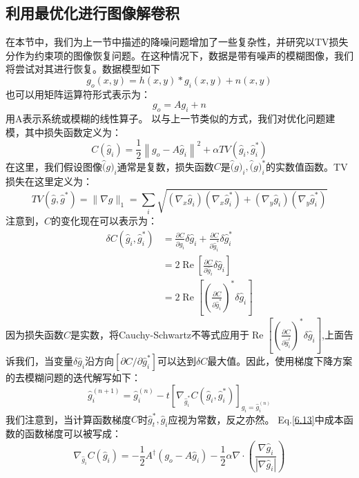 \documentclass[12pt, UTF8]{ctexart}%
\numberwithin{equation}{section}
\numberwithin{figure}{section}
\newcommand{\InsertEqution}[2]{\begin{equation}
  \label{#1}
   #2
 \end{equation}}
\newcommand{\RefEq}[1]{Eq.\ref{#1}}
\newcommand{\InsertInlineEq}[1]{$#1$}
\begin{document}
\begin{sloppypar}
\subsection{利用最优化进行图像解卷积}
在本节中，我们为上一节中描述的降噪问题增加了一些复杂性，并研究以TV损失分作为约束项的图像恢复问题。在这种情况下，数据是带有噪声的模糊图像，我们将尝试对其进行恢复。数据模型如下
\InsertEqution{6.11}{g_{o}(x, y)=h(x, y) * g_{i}(x, y)+n(x, y)}
也可以用矩阵运算符形式表示为：
\InsertEqution{6.12}{g_{o}=A g_{i}+n}
用A表示系统或模糊的线性算子。 以与上一节类似的方式，我们对优化问题建模，其中损失函数定义为：
\InsertEqution{6.13}{C\left(\hat{g}_{i}\right)=\frac{1}{2}\left\|g_{o}-A \hat{g}_{i}\right\|^{2}+\alpha T V\left(\hat{g}_{i}, \hat{g}_{i}^{*}\right)}
在这里，我们假设图像\InsertInlineEq{\hat(g)_i}通常是复数，损失函数\InsertInlineEq{C}是\InsertInlineEq{\hat(g)_i,\hat(g)_i^*}的实数值函数。TV损失在这里定义为：
\InsertEqution{6.14}{T V\left(\hat{g}, \hat{g}^{*}\right)=\|\nabla g\|_{1}=\sum_{i} \sqrt{\left(\nabla_{x} \hat{g}_{i}\right)\left(\nabla_{x} \hat{g}_{i}^{*}\right)+\left(\nabla_{y} \hat{g}_{i}\right)\left(\nabla_{y} \hat{g}_{i}^{*}\right)}}
注意到，\InsertInlineEq{C}的变化现在可以表示为：
\InsertEqution{6.15}{\begin{aligned}
  \delta C\left(\hat{g}_{i}, \hat{g}_{i}^{*}\right) &=\frac{\partial C}{\partial \hat{g}_{i}} \delta \hat{g}_{i}+\frac{\partial C}{\partial \hat{g}_{i}^{*}} \delta \hat{g}_{i}^{*} \\
  &=2 \operatorname{Re}\left[\frac{\partial C}{\partial \hat{g}_{i}} \delta \hat{g}_{i}\right] \\
  &=2 \operatorname{Re}\left[\left(\frac{\partial C}{\partial \hat{g}_{i}^{*}}\right)^{*} \delta \hat{g}_{i}\right]
  \end{aligned}}
因为损失函数\InsertInlineEq{C}是实数，将Cauchy-Schwartz不等式应用于\InsertInlineEq{\operatorname{Re}\left[\left(\frac{\partial C}{\partial \hat{g}_{i}^{i}}\right)^{*} \delta \hat{g}_{i}\right]},上面告诉我们，当变量\InsertInlineEq{\delta \hat{g}_i}沿方向\InsertInlineEq{\left[\partial C / \partial \hat{g}_{i}^{*}\right]}可以达到\InsertInlineEq{\delta C}最大值。因此，使用梯度下降方案的去模糊问题的迭代解写如下：
\InsertEqution{6.16}{\hat{g}_{i}^{(n+1)}=\hat{g}_{i}^{(n)}-t\left[\nabla_{\hat{g}_{i}^{*}} C\left(\hat{g}_{i}, \hat{g}_{i}^{*}\right)\right]_{\hat{g}_{i}=\hat{g}_{i}^{(n)}}}
我们注意到，当计算函数梯度\InsertInlineEq{C}时\InsertInlineEq{\hat{g}^*_t,\hat{g}_i}应视为常数，反之亦然。 \RefEq{6.13}中成本函数的函数梯度可以被写成：
\InsertEqution{6.17}{\nabla_{\hat{g}_{i}} C\left(\hat{g}_{i}\right)=-\frac{1}{2} A^{\dagger}\left(g_{o}-A \hat{g}_{i}\right)-\frac{1}{2} \alpha \nabla \cdot\left(\frac{\nabla \hat{g}_{i}}{\left|\nabla \hat{g}_{i}\right|}\right)}

\end{sloppypar}
\end{document}
